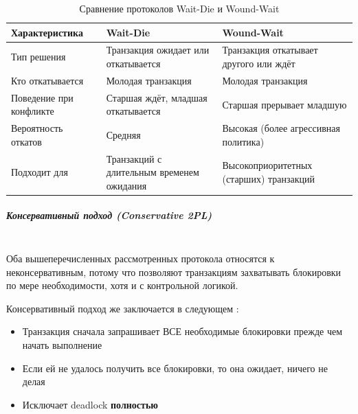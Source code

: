  \begin{table}[H]
     \centering
     \caption{Сравнение протоколов Wait-Die и Wound-Wait}
     \begin{tabular}{|l|p{5.25cm}|p{5.25cm}|}
         \hline
         \textbf{Характеристика} & \textbf{Wait-Die} & \textbf{Wound-Wait} \\
         \hline
         Тип решения & Транзакция ожидает или откатывается & Транзакция откатывает другого или ждёт \\
         \hline
         Кто откатывается & Молодая транзакция & Молодая транзакция \\
         \hline
         Поведение при конфликте & Старшая ждёт, младшая откатывается & Старшая прерывает младшую \\
         \hline
        Вероятность откатов & Средняя & Высокая (более агрессивная политика) \\
         \hline
         Подходит для & Транзакций с длительным временем ожидания & Высокоприоритетных (старших) транзакций \\
         \hline
     \end{tabular}
 \end{table}
 
 \subparagraph{Консервативный подход (Conservative 2PL)} ~\\

 Оба вышеперечисленных рассмотренных протокола относятся к неконсервативным, потому что позволяют транзакциям захватывать блокировки по мере необходимости, хотя и с контрольной логикой.
 
 Консервативный подход же заключается в следующем \autocite{Silberschatz, ElmasriNavathe}:
 \begin{itemize}
     \item Транзакция сначала запрашивает ВСЕ необходимые блокировки прежде чем начать выполнение
    \item Если ей не удалось получить все блокировки, то она ожидает, ничего не делая
     \item Исключает deadlock \textbf{полностью}
 \end{itemize}
 
